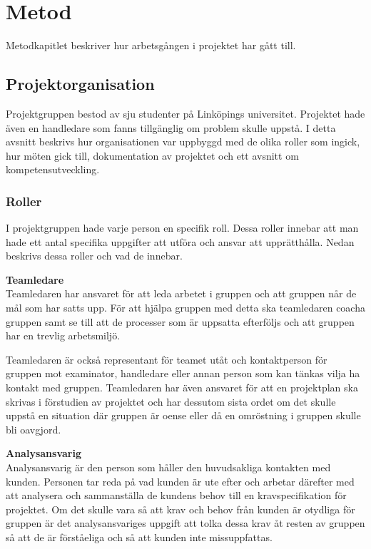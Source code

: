 \chapter{Metod}
Metodkapitlet beskriver hur arbetsgången i projektet har gått till.

\section{Projektorganisation}
Projektgruppen bestod av sju studenter på Linköpings universitet. Projektet hade även en handledare som fanns tillgänglig om problem skulle uppstå. I detta avsnitt beskrivs hur organisationen var uppbyggd med de olika roller som ingick, hur möten gick till, dokumentation av projektet och ett avsnitt om kompetensutveckling.

\subsection{Roller} \label{roller}
I projektgruppen hade varje person en specifik roll. Dessa roller innebar att man hade ett antal specifika uppgifter att utföra och ansvar att upprätthålla. Nedan beskrivs dessa roller och vad de innebar.

\textbf{Teamledare}\\
Teamledaren har ansvaret för att leda arbetet i gruppen och att gruppen når de mål som har satts upp. För att hjälpa gruppen med detta ska teamledaren coacha gruppen samt se till att de processer som är uppsatta efterföljs och att gruppen har en trevlig arbetsmiljö.

Teamledaren är också representant för teamet utåt och kontaktperson för gruppen mot examinator, handledare eller annan person som kan tänkas vilja ha kontakt med gruppen. Teamledaren har även ansvaret för att en projektplan ska skrivas i förstudien av projektet och har dessutom sista ordet om det skulle uppstå en situation där gruppen är oense eller då en omröstning i gruppen skulle bli oavgjord.

\textbf{Analysansvarig}\\
Analysansvarig är den person som håller den huvudsakliga kontakten med kunden. Personen tar reda på
vad kunden är ute efter och arbetar därefter med att analysera och sammanställa de kundens behov till en
kravspecifikation för projektet. Om det skulle vara så att krav och behov från kunden är otydliga för 
gruppen är det analysansvariges uppgift att tolka dessa krav åt resten av gruppen så att de är 
förståeliga och så att kunden inte missuppfattas.

